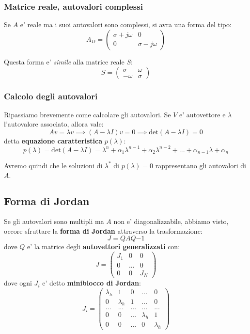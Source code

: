 \documentclass[a4paper,11pt]{article}
\begin{document}
\subsubsection{Matrice reale, autovalori complessi}
Se $A$ e' reale ma i suoi autovalori sono complessi, si avra una forma del tipo:
$$
A_D = \begin{pmatrix}
	\sigma + j\omega & 0 \\
	0 & \sigma - j\omega
\end{pmatrix}
$$

Questa forma e' \textit{simile} alla matrice reale $S$:
$$
S = \begin{pmatrix}
	\sigma & \omega \\
	-\omega & \sigma
\end{pmatrix}
$$

\subsubsection{Calcolo degli autovalori}
Ripassiamo brevemente come calcolare gli autovalori.
Se $V$ e' autovettore e $\lambda$ l'autovalore associato, allora vale:
$$
Av = \lambda v \implies (A - \lambda I)v = 0 \implies \mathrm{det} (A - \lambda I) = 0
$$
detta \textbf{equazione caratteristica} $p(\lambda)$: 
$$
p(\lambda) = \mathrm{det} (A - \lambda I) = \lambda^n + \alpha_1 \lambda^{n - 1} + \alpha_2 \lambda^{n - 2} + ... + \alpha_{n - 1} \lambda + \alpha_n
$$

Avremo quindi che le soluzioni di $\lambda^*$ di $p(\lambda) = 0$ rappresentano gli autovalori di $A$.

\subsection{Forma di Jordan}
Se gli autovalori sono multipli ma $A$ non e' diagonalizzabile, abbiamo visto, occore sfruttare la \textbf{forma di Jordan} attraverso la trasformazione:
$$
J = Q A Q{-1}
$$
dove $Q$ e' la matrice degli \textbf{autovettori generalizzati} con:
$$
J = \begin{pmatrix}
	J_1 & 0 & 0 \\
	0 & ... & 0 \\
	0 & 0 & J_N
\end{pmatrix}
$$
dove ogni $J_i$ e' detto \textbf{miniblocco di Jordan}:
$$
J_i = \begin{pmatrix}
	\lambda_h & 1 & 0 & ... & 0 \\ 
	0 & \lambda_h & 1 & ... & 0 \\ 
	... & ... & ... & ... & ... \\ 
	0 & 0 & ... & \lambda_h & 1 \\
	0 & 0 & ... & 0 & \lambda_h
\end{pmatrix}
$$
\end{document}
